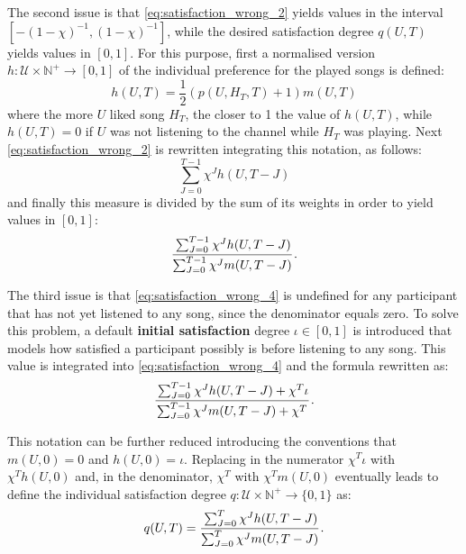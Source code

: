 The second issue is that \eqref{eq:satisfaction_wrong_2} yields values in the interval $[-(1-\chi)^{-1}, (1-\chi)^{-1}]$, while the desired satisfaction degree $q(U,T)$ yields values in $[0,1]$.
For this purpose, first a normalised version $h: \mathcal{U} \times \mathbb{N}^+ \to [0,1]$ of the individual preference for the played songs is defined:
\begin{equation*}
h(U,T) = \frac{1}{2} \left( p(U,H_T,T) + 1 \right) m(U,T)
\end{equation*}
where the more $U$ liked song $H_T$, the closer to 1 the value of $h(U,T)$, while $h(U,T) = 0$ if $U$ was not listening to the channel while $H_T$ was playing.
%
Next \eqref{eq:satisfaction_wrong_2} is rewritten integrating this notation, as follows:
\begin{equation*}
 \sum_{J = 0}^{T-1} \chi^{J} h(U,T-J)
\end{equation*}
and finally this measure is divided by the sum of its weights in order to yield values in $[0,1]$:
\begin{equation}\label{eq:satisfaction_wrong_4}
 \cfrac{\sum_{J = 0}^{T-1} \chi^{J} h(U,T-J)}
       {\sum_{J = 0}^{T-1} \chi^{J} m(U,T-J)}\,.
\end{equation}

The third issue is that \eqref{eq:satisfaction_wrong_4} is undefined for any participant that has not yet listened to any song, since the denominator equals zero.
To solve this problem, a default \textbf{initial satisfaction} degree $\iota \in [0,1]$ is introduced that models how satisfied a participant possibly is before listening to any song. %
This value is integrated into  \eqref{eq:satisfaction_wrong_4} and the formula rewritten as:
\begin{equation*}
 \cfrac{\sum_{J = 0}^{T-1} \chi^{J} h(U,T-J) + \chi^T \iota}
       {\sum_{J = 0}^{T-1} \chi^{J} m(U,T-J) + \chi^T}\,.
\end{equation*}

This notation can be further reduced introducing the conventions that $m(U,0) = 0$ and $h(U,0) = \iota$.
Replacing in the numerator $\chi^T \iota$ with $\chi^T h(U,0)$ and, in the denominator, $\chi^T$ with $\chi^T m(U,0)$ eventually leads to define the individual satisfaction degree $q: \mathcal{U} \times \mathbb{N}^+ \to \{0,1\}$ as:
\begin{equation}
\label{eq:individual_satisfaction}
q(U,T) = \cfrac{\sum_{J = 0}^{T} \chi^{J} h(U,T-J)} {\sum_{J = 0}^{T} \chi^{J} m(U,T-J)}\,.
\end{equation}

